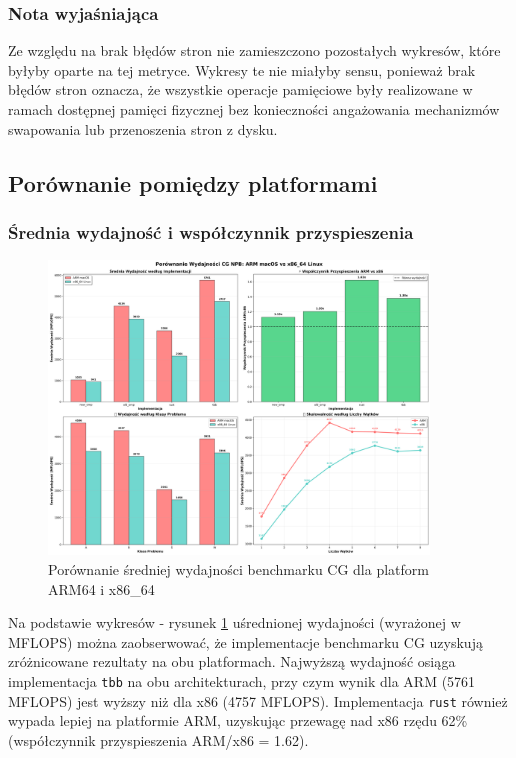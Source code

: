 \subsubsection{Nota wyjaśniająca}
Ze względu na brak błędów stron nie zamieszczono pozostałych wykresów, które byłyby oparte na tej metryce. Wykresy te nie miałyby sensu, ponieważ brak błędów stron oznacza, że wszystkie operacje pamięciowe były realizowane w ramach dostępnej pamięci fizycznej bez konieczności angażowania mechanizmów swapowania lub przenoszenia stron z dysku.

\subsection{Porównanie pomiędzy platformami}
\subsubsection{Średnia wydajność i współczynnik przyspieszenia}
\begin{figure}[H]
    \centering
    \includegraphics[width=0.9\textwidth]{analiza/images/parallel/cg/compare/cg_porownanie_platform_arm_vs_x86.png}
    \caption{Porównanie średniej wydajności benchmarku CG dla platform ARM64 i x86\_64}
    \label{cg_porownanie_platform_arm_vs_x86}
\end{figure}
Na podstawie wykresów - rysunek \ref{cg_porownanie_platform_arm_vs_x86} uśrednionej wydajności (wyrażonej w MFLOPS) można zaobserwować, że implementacje benchmarku CG uzyskują zróżnicowane rezultaty na obu platformach. Najwyższą wydajność osiąga implementacja \texttt{tbb} na obu architekturach, przy czym wynik dla ARM (5761 MFLOPS) jest wyższy niż dla x86 (4757 MFLOPS). Implementacja \texttt{rust} również wypada lepiej na platformie ARM, uzyskując przewagę nad x86 rzędu 62\% (współczynnik przyspieszenia ARM/x86 = 1.62).

